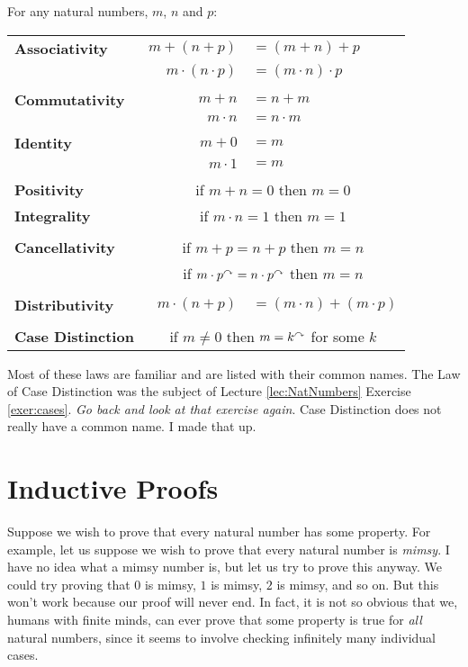 \begin{laws}
\noindent For any natural numbers, $m$, $n$ and $p$:

\begin{tabular}{lr@{\,}l}
\textbf{Associativity}& $m + (n + p)$       &$= (m+n)+p$\\
                      & $m \cdot(n\cdot p)$ &$= (m\cdot n)\cdot p$\\
&&\\                      
\textbf{Commutativity}& $m + n$             &$= n + m$\\
                      & $m\cdot n$          &$= n\cdot m$\\
&&\\ 
\textbf{Identity}     & $m + 0$             &$= m$\\
                      & $m\cdot 1$          &$= m$\\
&&\\
\textbf{Positivity}   &\multicolumn{2}{c}{if $m + n = 0$ then $m=0$}\\
\textbf{Integrality}  &\multicolumn{2}{c}{if $m\cdot n = 1$ then $m=1$}\\
&&\\
\textbf{Cancellativity}&\multicolumn{2}{c}{if $m + p = n+p$ then $m=n$}\\
                       &\multicolumn{2}{c}{if $m \cdot p^\curvearrowright = n\cdot p^\curvearrowright$ then $m=n$}\\
&&\\
\textbf{Distributivity}&$m\cdot(n+p)$&$= (m\cdot n) + (m\cdot p)$\\
&&\\
\textbf{Case Distinction}&\multicolumn{2}{c}{if $m\neq 0$ then $m=k^\curvearrowright$ for some $k$}\\
\end{tabular}
\end{laws}
\medskip

Most of these laws are familiar and are listed with their common names. The Law of Case
Distinction was the subject of Lecture \ref{lec:NatNumbers} Exercise \ref{exer:cases}. \emph{Go back and look at that exercise again}.
Case Distinction does not really have a common name. I made that up.

\ipadbreak

\section{Inductive Proofs}

Suppose we wish to prove that every natural number has some
property. For example, let us suppose we wish to prove that every
natural number is \emph{mimsy}.  I have no idea what a mimsy number
is, but let us try to prove this anyway. We could try proving that $0$
is mimsy, $1$ is mimsy, $2$ is mimsy, and so on.  But this won't work
because our proof will never end. In fact, it is not so obvious that
we, humans with finite minds, can ever prove that some property is
true for \emph{all} natural numbers, since it seems to involve
checking infinitely many individual cases.

